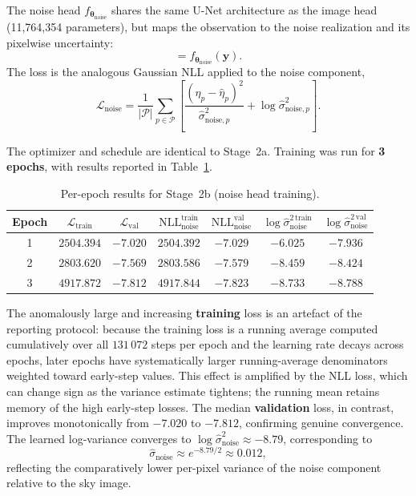 \documentclass{aa}
\begin{document}
The noise head $f_{\boldsymbol{\theta}_\mathrm{noise}}$ shares the same U-Net architecture as the image head (11,764,354 parameters), but maps the observation to the noise realization and its pixelwise uncertainty:
\begin{equation}
[\hat{\boldsymbol{\eta}},\, \hat{s}_\mathrm{noise}] = f_{\boldsymbol{\theta}_\mathrm{noise}}(\mathbf{y}).
\end{equation}
The loss is the analogous Gaussian NLL applied to the noise component,
\begin{equation}
\mathcal{L}_\mathrm{noise}
=
\frac{1}{|\mathcal{P}|}\sum_{p \in \mathcal{P}}
\left[
\frac{(\eta_p - \hat{\eta}_p)^{2}}{\hat{\sigma}^{2}_{\mathrm{noise},p}}
+ \log \hat{\sigma}^{2}_{\mathrm{noise},p}
\right].
\end{equation}

The optimizer and schedule are identical to Stage~2a. Training was run for \textbf{3 epochs}, with results reported in Table~\ref{tab:step2b}.

\begin{table}[h]
\centering
\begin{tabular}{|c|c|c|c|c|c|c|}
\hline
\textbf{Epoch} & $\mathcal{L}_\mathrm{train}$ & $\mathcal{L}_\mathrm{val}$ & $\mathrm{NLL}_\mathrm{noise}^\mathrm{train}$ & $\mathrm{NLL}_\mathrm{noise}^\mathrm{val}$ & $\log\hat{\sigma}^{2\,\mathrm{train}}_\mathrm{noise}$ & $\log\hat{\sigma}^{2\,\mathrm{val}}_\mathrm{noise}$ \\
\hline
1 & $2504.394$ & $-7.020$ & $2504.392$ & $-7.029$ & $-6.025$ & $-7.936$ \\
2 & $2803.620$ & $-7.569$ & $2803.586$ & $-7.579$ & $-8.459$ & $-8.424$ \\
3 & $\mathbf{4917.872}$ & $\mathbf{-7.812}$ & $4917.844$ & $-7.823$ & $-8.733$ & $-8.788$ \\
\hline
\end{tabular}
\caption{Per-epoch results for Stage~2b (noise head training).}
\label{tab:step2b}
\end{table}

The anomalously large and increasing \textbf{training} loss is an artefact of the reporting protocol: because the training loss is a running average computed cumulatively over all $131\,072$ steps per epoch and the learning rate decays across epochs, later epochs have systematically larger running-average denominators weighted toward early-step values. This effect is amplified by the NLL loss, which can change sign as the variance estimate tightens; the running mean retains memory of the high early-step losses. The median \textbf{validation} loss, in contrast, improves monotonically from $-7.020$ to $-7.812$, confirming genuine convergence. The learned log-variance converges to $\log\hat{\sigma}^2_\mathrm{noise} \approx -8.79$, corresponding to
\begin{equation}
\hat{\sigma}_\mathrm{noise} \approx e^{-8.79/2} \approx 0.012,
\end{equation}
reflecting the comparatively lower per-pixel variance of the noise component relative to the sky image.
\end{document}
